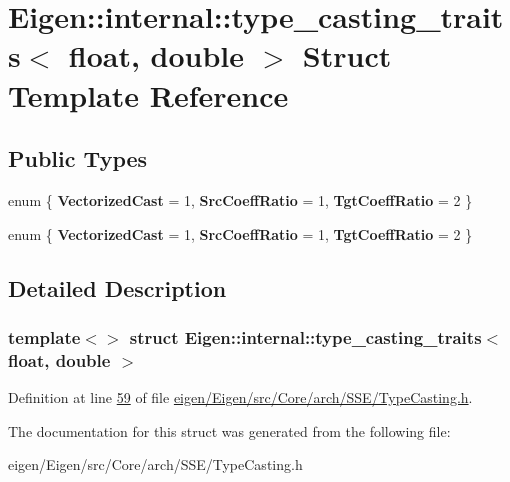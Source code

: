 \hypertarget{struct_eigen_1_1internal_1_1type__casting__traits_3_01float_00_01double_01_4}{}\section{Eigen\+:\+:internal\+:\+:type\+\_\+casting\+\_\+traits$<$ float, double $>$ Struct Template Reference}
\label{struct_eigen_1_1internal_1_1type__casting__traits_3_01float_00_01double_01_4}
\subsection*{Public Types}
\begin{DoxyCompactItemize}
\item 
\mbox{\label{struct_eigen_1_1internal_1_1type__casting__traits_3_01float_00_01double_01_4_a805516b46bccedf2cf44ac3b0b15dc36}} 
enum \{ {\bfseries Vectorized\+Cast} = 1, 
{\bfseries Src\+Coeff\+Ratio} = 1, 
{\bfseries Tgt\+Coeff\+Ratio} = 2
 \}
\item 
\mbox{\label{struct_eigen_1_1internal_1_1type__casting__traits_3_01float_00_01double_01_4_a45fe9b1093dbdc16baa4b82bdb7287a3}} 
enum \{ {\bfseries Vectorized\+Cast} = 1, 
{\bfseries Src\+Coeff\+Ratio} = 1, 
{\bfseries Tgt\+Coeff\+Ratio} = 2
 \}
\end{DoxyCompactItemize}


\subsection{Detailed Description}
\subsubsection*{template$<$$>$\newline
struct Eigen\+::internal\+::type\+\_\+casting\+\_\+traits$<$ float, double $>$}



Definition at line \hyperlink{eigen_2_eigen_2src_2_core_2arch_2_s_s_e_2_type_casting_8h_source_l00059}{59} of file \hyperlink{eigen_2_eigen_2src_2_core_2arch_2_s_s_e_2_type_casting_8h_source}{eigen/\+Eigen/src/\+Core/arch/\+S\+S\+E/\+Type\+Casting.\+h}.



The documentation for this struct was generated from the following file\+:\begin{DoxyCompactItemize}
\item 
eigen/\+Eigen/src/\+Core/arch/\+S\+S\+E/\+Type\+Casting.\+h\end{DoxyCompactItemize}
